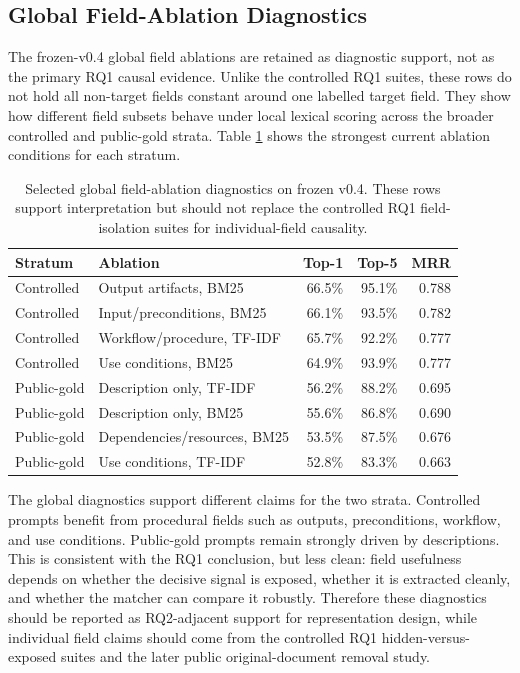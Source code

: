 \subsection{Global Field-Ablation Diagnostics}

The frozen-v0.4 global field ablations are retained as diagnostic support, not as the primary RQ1 causal evidence. Unlike the controlled RQ1 suites, these rows do not hold all non-target fields constant around one labelled target field. They show how different field subsets behave under local lexical scoring across the broader controlled and public-gold strata. Table \ref{tab:field-ablation-v04} shows the strongest current ablation conditions for each stratum.

\begin{table}[h]
\centering
\small
\begin{tabular}{llrrr}
\toprule
Stratum & Ablation & Top-1 & Top-5 & MRR \\
\midrule
Controlled & Output artifacts, BM25 & 66.5\% & 95.1\% & 0.788 \\
Controlled & Input/preconditions, BM25 & 66.1\% & 93.5\% & 0.782 \\
Controlled & Workflow/procedure, TF-IDF & 65.7\% & 92.2\% & 0.777 \\
Controlled & Use conditions, BM25 & 64.9\% & 93.9\% & 0.777 \\
Public-gold & Description only, TF-IDF & 56.2\% & 88.2\% & 0.695 \\
Public-gold & Description only, BM25 & 55.6\% & 86.8\% & 0.690 \\
Public-gold & Dependencies/resources, BM25 & 53.5\% & 87.5\% & 0.676 \\
Public-gold & Use conditions, TF-IDF & 52.8\% & 83.3\% & 0.663 \\
\bottomrule
\end{tabular}
\caption{Selected global field-ablation diagnostics on frozen v0.4. These rows support interpretation but should not replace the controlled RQ1 field-isolation suites for individual-field causality.}
\label{tab:field-ablation-v04}
\end{table}

The global diagnostics support different claims for the two strata. Controlled prompts benefit from procedural fields such as outputs, preconditions, workflow, and use conditions. Public-gold prompts remain strongly driven by descriptions. This is consistent with the RQ1 conclusion, but less clean: field usefulness depends on whether the decisive signal is exposed, whether it is extracted cleanly, and whether the matcher can compare it robustly. Therefore these diagnostics should be reported as RQ2-adjacent support for representation design, while individual field claims should come from the controlled RQ1 hidden-versus-exposed suites and the later public original-document removal study.

